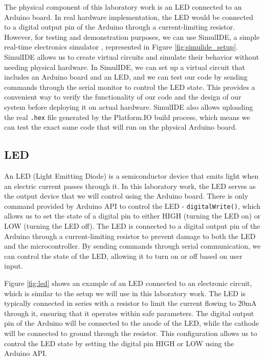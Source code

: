 The physical component of this laboratory work is an LED connected to an Arduino board. In real hardware implementation, the LED would be connected to a digital output pin of the Arduino through a current-limiting resistor. However, for testing and demonstration purposes, we can use SimulIDE, a simple real-time electronics simulator \cite{simulide}, represented in Figure \ref{fig:simulide_setup}. SimulIDE allows us to create virtual circuits and simulate their behavior without needing physical hardware. In SimulIDE, we can set up a virtual circuit that includes an Arduino board and an LED, and we can test our code by sending commands through the serial monitor to control the LED state. This provides a convenient way to verify the functionality of our code and the design of our system before deploying it on actual hardware. SimulIDE also allows uploading the real \texttt{.hex} file generated by the Platform.IO build process, which means we can test the exact same code that will run on the physical Arduino board.

\subsection{LED}

An LED (Light Emitting Diode) is a semiconductor device that emits light when an electric current passes through it. In this laboratory work, the LED serves as the output device that we will control using the Arduino board. There is only command provided by Arduino API to control the LED - \texttt{digitalWrite()}, which allows us to set the state of a digital pin to either HIGH (turning the LED on) or LOW (turning the LED off). The LED is connected to a digital output pin of the Arduino through a current-limiting resistor to prevent damage to both the LED and the microcontroller. By sending commands through serial communication, we can control the state of the LED, allowing it to turn on or off based on user input.

Figure \ref{fig:led} shows an example of an LED connected to an electronic circuit, which is similar to the setup we will use in this laboratory work. The LED is typically connected in series with a resistor to limit the current flowing to 20mA \cite{led-limit} through it, ensuring that it operates within safe parameters. The digital output pin of the Arduino will be connected to the anode of the LED, while the cathode will be connected to ground through the resistor. This configuration allows us to control the LED state by setting the digital pin HIGH or LOW using the Arduino API.

